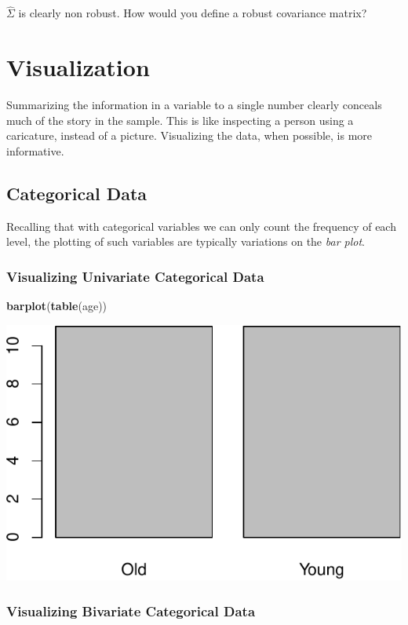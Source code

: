\documentclass[]{book}
\newenvironment{Shaded}{\begin{snugshade}}{\end{snugshade}}
\newcommand{\KeywordTok}[1]{\textcolor[rgb]{0.13,0.29,0.53}{\textbf{#1}}}
\newcommand{\NormalTok}[1]{#1}
\theoremstyle{definition}
\theoremstyle{definition}
\theoremstyle{definition}
\theoremstyle{remark}
\let\BeginKnitrBlock\begin \let\EndKnitrBlock\end
\begin{document}
\BeginKnitrBlock{remark}
{}\(\hat \Sigma\) is clearly non robust. How
would you define a robust covariance matrix?
\EndKnitrBlock{remark}

\section{Visualization}\label{visualization}

Summarizing the information in a variable to a single number clearly
conceals much of the story in the sample. This is like inspecting a
person using a caricature, instead of a picture. Visualizing the data,
when possible, is more informative.

\subsection{Categorical Data}\label{categorical-data-1}

Recalling that with categorical variables we can only count the
frequency of each level, the plotting of such variables are typically
variations on the \emph{bar plot}.

\subsubsection{Visualizing Univariate Categorical
Data}\label{visualizing-univariate-categorical-data}

\begin{Shaded}
\begin{Highlighting}[]
\KeywordTok{barplot}\NormalTok{(}\KeywordTok{table}\NormalTok{(age))}
\end{Highlighting}
\end{Shaded}

\includegraphics[width=0.5\linewidth]{Rcourse_files/figure-latex/barplot-1}

\subsubsection{Visualizing Bivariate Categorical
Data}\label{visualizing-bivariate-categorical-data}
\end{document}
